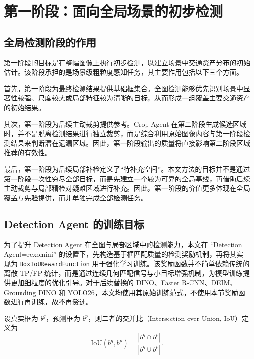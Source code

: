 \section{第一阶段：面向全局场景的初步检测}
\label{sec:stage1_global_detection}

\subsection{全局检测阶段的作用}
\label{subsec:role_of_global_detection}

第一阶段的目标是在整幅图像上执行初步检测，以建立场景中交通资产分布的初始估计。该阶段承担的是场景级粗粒度感知任务，其主要作用包括以下三个方面。

首先，第一阶段为最终检测结果提供基础框集合。全图检测能够优先识别场景中显著性较强、尺度较大或局部特征较为清晰的目标，从而形成一组覆盖主要交通资产的初始结果。

其次，第一阶段为后续主动裁剪提供参考。Crop Agent 在第二阶段生成候选区域时，并不是脱离检测结果进行独立裁剪，而是综合利用原始图像内容与第一阶段检测结果来判断潜在遗漏区域。因此，第一阶段输出的质量将直接影响第二阶段区域推荐的有效性。

最后，第一阶段为后续局部补检定义了“待补充空间”。本文方法的目标并不是通过第一阶段一次性穷尽全部目标，而是先建立一个较为可靠的全局基线，再借助后续主动裁剪与局部精检对疑难区域进行补充。因此，第一阶段的价值更多体现在全局覆盖与先验提供，而非单独完成全部检测任务。

\subsection{Detection Agent 的训练目标}
\label{subsec:detection_agent_training_objective}

为了提升 Detection Agent 在全图与局部区域中的检测能力，本文在 “Detection Agent=rexomini” 的设置下，先构造基于框匹配质量的检测奖励机制，再将其实现为 \texttt{BoxIoURewardFunction} 用于强化学习训练。该奖励函数并不简单依赖传统的离散 TP/FP 统计，而是通过连续几何匹配信号与小目标增强机制，为模型训练提供更加细粒度的优化引导。对于后续替换的 DINO、Faster R-CNN、DEIM、Grounding DINO 和 YOLO26，本文均使用其原始训练范式，不使用本节奖励函数进行再训练，故不再赘述。

设真实框为 $b^g$，预测框为 $b^p$，则二者的交并比（Intersection over Union, IoU）定义为：
\begin{equation}
\mathrm{IoU}(b^g, b^p)=\frac{|b^g\cap b^p|}{|b^g\cup b^p|}.
\label{eq:iou}
\end{equation}

